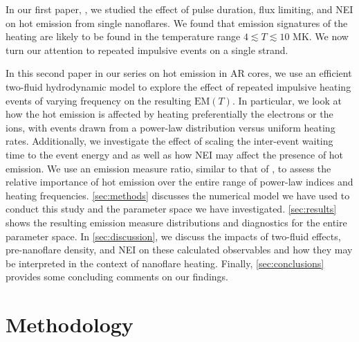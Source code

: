 \documentclass[apj]{emulateapj}
\begin{document}
	\par In our first paper, \citet{barnes_inference_2016} , we studied the effect of pulse duration, flux limiting, and NEI on hot emission from single nanoflares. We found that emission signatures of the heating are likely to be found in the temperature range $4\lesssim T\lesssim 10$ MK. We now turn our attention to repeated impulsive events on a single strand.
	\par In this second paper in our series on hot emission in AR cores, we use an efficient two-fluid hydrodynamic model to explore the effect of repeated impulsive heating events of varying frequency on the resulting $\mathrm{EM}(T)$. In particular, we look at how the hot emission is affected by heating preferentially the electrons or the ions, with events drawn from a power-law distribution versus uniform heating rates. Additionally, we investigate the effect of scaling the inter-event waiting time to the event energy and as well as how NEI may affect the presence of hot emission. We use an emission measure ratio, similar to that of \citet{brosius_pervasive_2014}, to assess the relative importance of hot emission over the entire range of power-law indices and heating frequencies. \autoref{sec:methods} discusses the numerical model we have used to conduct this study and the parameter space we have investigated. \autoref{sec:results} shows the resulting emission measure distributions and diagnostics for the entire parameter space. In \autoref{sec:discussion}, we discuss the impacts of two-fluid effects, pre-nanoflare density, and NEI on these calculated observables and how they may be interpreted in the context of nanoflare heating. Finally, \autoref{sec:conclusions} provides some concluding comments on our findings.
	\section{Methodology}
	\label{sec:methods}
\end{document}
